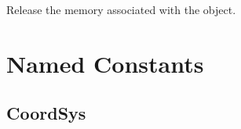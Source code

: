 \documentclass[letterpaper,10pt,english]{sphinxmanual}
\begin{document}
\begin{fulllineitems}
\begin{fulllineitems}
\begin{quote}
\begin{description}
\end{description}\end{quote}

\end{fulllineitems}


\begin{fulllineitems}
\label{\detokenize{regridfromfile:ESMF.api.regrid.RegridFromFile.destroy}}
Release the memory associated with the {\hyperref[\detokenize{regridfromfile:ESMF.api.regrid.RegridFromFile}]{}}
object.

\end{fulllineitems}


\end{fulllineitems}



\section{Named Constants}
\label{\detokenize{appendix:named-constants}}

\subsection{CoordSys}
\label{\detokenize{CoordSys:coordsys}}\label{\detokenize{CoordSys::doc}}
\end{document}
